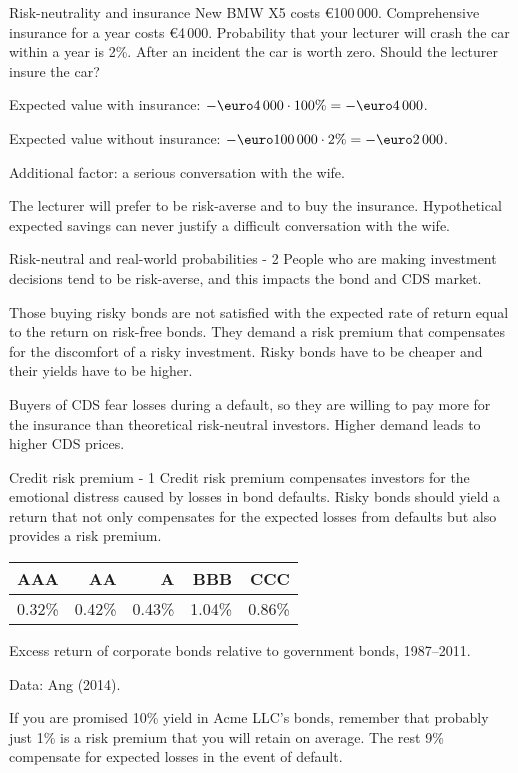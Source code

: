 \documentclass{beamer}
\renewcommand{\EUR}[1]{\textup{\euro}#1}
\begin{document}
\begin{frame}{Risk-neutrality and insurance}
\justify
New BMW X5 costs \EUR{100\,000}. Comprehensive insurance for a year costs \EUR{4\,000}. Probability that your lecturer will crash the car within a year is 2\%. After an incident the car is worth zero. Should the lecturer insure the car?

\justify
Expected value with insurance: $-\EUR{4\,000} \cdot 100\% = -\EUR{4\,000}$.

\justify
Expected value without insurance: $-\EUR{100\,000} \cdot 2\% = -\EUR{2\,000}$.

Additional factor: a serious conversation with the wife.

\justify
The lecturer will prefer to be risk-averse and to buy the insurance. Hypothetical expected savings can never justify a difficult conversation with the wife.
\end{frame}



\begin{frame}{Risk-neutral and real-world probabilities - 2}
\justify
People who are making investment decisions tend to be risk-averse, and this impacts the bond and CDS market.

\justify
Those buying risky bonds are not satisfied with the expected rate of return equal to the return on risk-free bonds. They demand a risk premium that compensates for the discomfort of a risky investment. Risky bonds have to be cheaper and their yields have to be higher.

\justify
Buyers of CDS fear losses during a default, so they are willing to pay more for the insurance than theoretical risk-neutral investors. Higher demand leads to higher CDS prices.

\end{frame}



\begin{frame}{Credit risk premium - 1}
\justify
\alert{Credit risk premium} compensates investors for the emotional distress caused by losses in bond defaults. Risky bonds should yield a return that not only compensates for the expected losses from defaults but also provides a risk premium.

\justify
\centering
\begin{tabular}{r|r|r|r|r}
AAA    & AA     & A      & BBB    & CCC \\ \hline
0.32\% & 0.42\% & 0.43\% & 1.04\% & 0.86\%  
\end{tabular}

\justify
\centering
{\scriptsize Excess return of corporate bonds relative to government bonds, 1987--2011.

Data: Ang (2014).}

\justify
If you are promised 10\% yield in Acme LLC's bonds, remember that probably just 1\% is a risk premium that you will retain on average. The rest 9\% compensate for expected losses in the event of default.
\end{frame}
\end{document}
